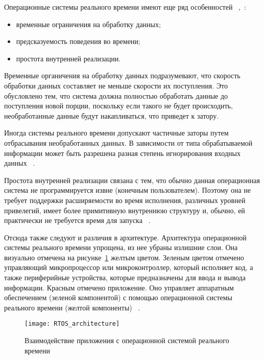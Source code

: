 Операционные системы реального времени имеют еще ряд особенностей
~\cite{tanenbaum_modern_os_2015_ru},~\cite{rtos_valvano}:
\begin{itemize}
    \item временные ограничения на обработку данных;
    \item предсказуемость поведения во времени;
    \item простота внутренней реализации.
\end{itemize}

Временные органичения на обработку данных подразумевают, что скорость обработки
данных составляет не меньше скорости их поступления. Это обусловлено тем, что
система должна полностью обработать данные до поступления новой порции, поскольку
если такого не будет происходить, необработанные данные будут накапливаться,
что приведет к затору.

Иногда системы реального времени допускают частичные заторы путем отбрасывания
необработанных данных. В зависимости от типа обрабатываемой информации
может быть разрешена разная степень игнорирования входных данных
~\cite{tanenbaum_modern_os_2015_ru}.

Простота внутренней реализации связана с тем, что обычно данная
операционная система не программируется извне (конечным пользователем).
Поэтому она не требует поддержки расширяемости во время исполнения,
различных уровней привелегий, имеет более примитивную внутреннюю структуру
и, обычно, ей практически не требуется время для запуска ~\cite{rtos_valvano}.

Отсюда также следуют и различия в архитектуре. Архитектура операционной системы
реального времени упрощена, из нее убраны излишние слои.
Она визуально отмечена на рисунке~\ref{pic:lit_review:rtos_arch} желтым цветом.
Зеленым цветом отмечено управляющий микропроцессор или микроконтроллер, который
исполняет код, а также периферийные устройства, которые предназначены
для ввода и вывода информации. Красным отмечено приложение. Оно
управляет аппаратным обеспечением (зеленой компонентой) с помощью операционной
системы реального времени (желтой компоненты) ~\cite{rtos_arch_site}.

\aconstskip\begin{figure}
    \centering
    \texttt{[image: RTOS\_architecture]}
    \caption{Взаимодействие приложения с операционной системой реального времени}
    \label{pic:lit_review:rtos_arch}

\end{figure}\constskip

